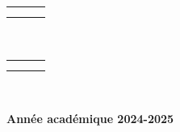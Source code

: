 \documentclass[a4paper, 14pt]{report}
\begin{document}
\begin{center}
{\begin{center}

\begin{tabularx}{\textwidth}{>{\centering}XcX<{\centering}}
	
	& & \\
	& & \\
	
\end{tabularx}\\


\begin{tabularx}{\textwidth}{>{\centering}XcX<{\centering}}
	
	& & \\
	& & \\
\end{tabularx}\

\textbf{Année académique 2024-2025}

\end{center} \thispagestyle{empty}
}

\normalsize




\end{center} \thispagestyle{empty}
\end{document}
